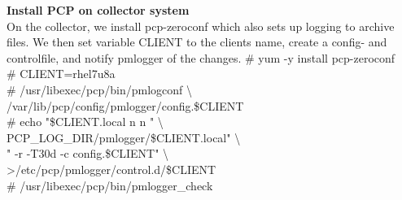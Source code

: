 \documentclass[12pt]{article}
\begin{document}
\begin{tcbposter}
{		\textbf{Install PCP on collector system} \\
	On the collector, we install pcp-zeroconf which also sets up logging to archive files.
	We then set variable CLIENT to the clients name, create a config- and controlfile,
	and notify pmlogger of the changes.
	\footnotesize{
	    \hspace*{0.5cm}\# yum -y install pcp-zeroconf \\
	    \hspace*{0.5cm}\# CLIENT=rhel7u8a \\
	    \hspace*{0.5cm}\# /usr/libexec/pcp/bin/pmlogconf \textbackslash \\
	    \hspace*{1.1cm}   /var/lib/pcp/config/pmlogger/config.\$CLIENT \\
	    \hspace*{0.5cm}\# echo "\$CLIENT.local n n " \textbackslash \\
	    \hspace*{1.1cm}   PCP\_LOG\_DIR/pmlogger/\$CLIENT.local" \textbackslash \\
	    \hspace*{1.1cm}   " -r -T30d -c config.\$CLIENT" \textbackslash \\
	    \hspace*{1.1cm}   \textgreater/etc/pcp/pmlogger/control.d/\$CLIENT \\
	    \hspace*{0.5cm}\# /usr/libexec/pcp/bin/pmlogger\_check
	}



}




\end{tcbposter}
\end{document}
